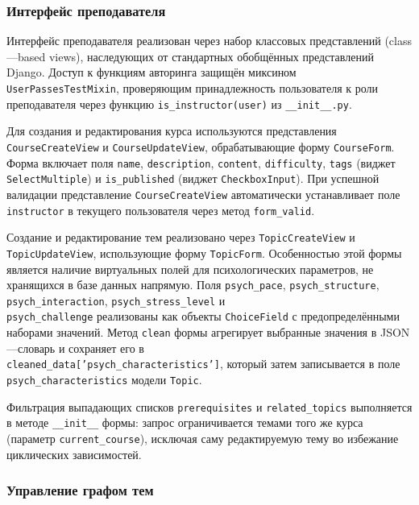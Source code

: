 \subsubsection{Интерфейс преподавателя}

Интерфейс преподавателя реализован через набор классовых представлений 
(class---based views), наследующих от стандартных обобщённых представлений 
Django. Доступ к функциям авторинга защищён миксином 
\texttt{UserPassesTestMixin}, проверяющим принадлежность пользователя 
к роли преподавателя через функцию \texttt{is\_instructor(user)} из 
\texttt{\_\_init\_\_.py}.

Для создания и редактирования курса используются представления 
\texttt{CourseCreateView} и \texttt{CourseUpdateView}, обрабатывающие 
форму \texttt{CourseForm}. Форма включает поля \texttt{name}, 
\texttt{description}, \texttt{content}, \texttt{difficulty}, 
\texttt{tags} (виджет \texttt{SelectMultiple}) и \texttt{is\_published} 
(виджет \texttt{CheckboxInput}). При успешной валидации представление 
\texttt{CourseCreateView} автоматически устанавливает поле 
\texttt{instructor} в текущего пользователя через метод 
\texttt{form\_valid}.

Создание и редактирование тем реализовано через \texttt{TopicCreateView} 
и \texttt{TopicUpdateView}, использующие форму \texttt{TopicForm}. 
Особенностью этой формы является наличие виртуальных полей для 
психологических параметров, не хранящихся в базе данных напрямую. 
Поля \texttt{psych\_pace}, \texttt{psych\_structure}, 
\texttt{psych\_interaction}, \texttt{psych\_stress\_level} и\\ 
\texttt{psych\_challenge} реализованы как объекты \texttt{ChoiceField} 
с предопределёнными наборами значений. Метод \texttt{clean} формы 
агрегирует выбранные значения в JSON---словарь и сохраняет его в\\ 
\texttt{cleaned\_data['psych\_characteristics']}, который затем 
записывается в поле \texttt{psych\_characteristics} модели \texttt{Topic}.

Фильтрация выпадающих списков \texttt{prerequisites} и 
\texttt{related\_topics} выполняется в методе \texttt{\_\_init\_\_} 
формы: запрос ограничивается темами того же курса (параметр 
\texttt{current\_course}), исключая саму редактируемую тему во 
избежание циклических зависимостей.

\subsubsection{Управление графом тем}

